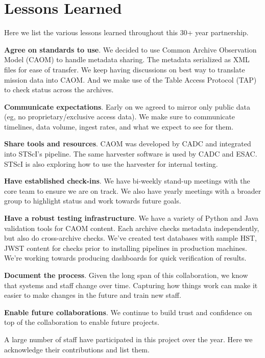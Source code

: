 \documentclass[11pt,twoside]{article}
\begin{document}
\section{Lessons Learned}

Here we list the various lessons learned throughout this 30+ year partnership.

\textbf{Agree on standards to use}. 
We decided to use Common Archive Observation Model (CAOM) to handle metadata sharing. 
The metadata serialized as XML files for ease of transfer. 
We keep having discussions on best way to translate mission data into CAOM. 
And we make use of the Table Access Protocol (TAP) to check status across the archives.

\textbf{Communicate expectations}.
Early on we agreed to mirror only public data (eg, no proprietary/exclusive access data). 
We make sure to communicate timelines, data volume, ingest rates, and what we expect to see for them. 

\textbf{Share tools and resources}. 
CAOM was developed by CADC and integrated into STScI's pipeline.
The same harvester software is used by CADC and ESAC. 
STScI is also exploring how to use the harvester for internal testing.

\textbf{Have established check-ins}.
We have bi-weekly stand-up meetings with the core team to ensure we are on track. 
We also have yearly meetings with a broader group to highlight status and work towards future goals.

\textbf{Have a robust testing infrastructure}.
We have a variety of Python and Java validation tools for CAOM content. 
Each archive checks metadata independently, but also do cross-archive checks. 
We've created test databases with sample HST, JWST content for checks prior to installing pipelines in production machines.
We're working towards producing dashboards for quick verification of results.

\textbf{Document the process}.
Given the long span of this collaboration, we know that systems and staff change over time. 
Capturing how things work can make it easier to make changes in the future and train new staff.

\textbf{Enable future collaborations}.
We continue to build trust and confidence on top of the collaboration to enable future projects.

\acknowledgements 

A large number of staff have participated in this project over the year. 
Here we acknowledge their contributions and list them.
\end{document}

